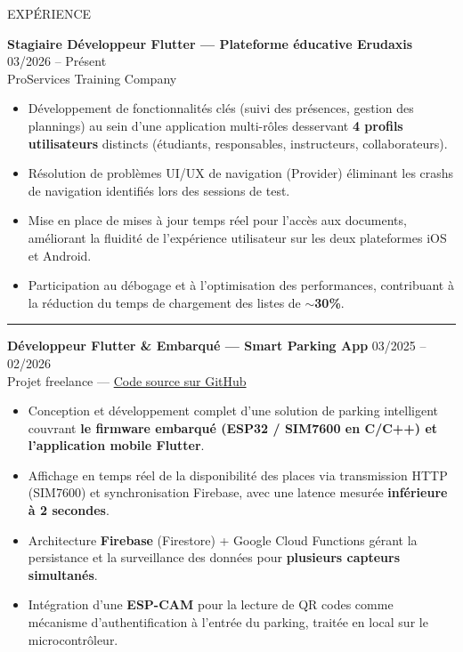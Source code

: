 \documentclass{resume}
\begin{document}
\begin{rSection}{EXPÉRIENCE}

{\bf Stagiaire Développeur Flutter — Plateforme éducative Erudaxis} \hfill {03/2026 -- Présent}\\
ProServices Training Company
\begin{itemize}
    \item Développement de fonctionnalités clés (suivi des présences, gestion des plannings) au sein
          d'une application multi-rôles desservant \textbf{4 profils utilisateurs} distincts
          (étudiants, responsables, instructeurs, collaborateurs).
    \item Résolution de problèmes UI/UX de navigation (Provider) éliminant les crashs de navigation identifiés lors des sessions de test.
    \item Mise en place de mises à jour temps réel pour l'accès aux documents, améliorant la fluidité
          de l'expérience utilisateur sur les deux plateformes iOS et Android.
    \item Participation au débogage et à l'optimisation des performances, contribuant à la réduction
          du temps de chargement des listes de \textbf{$\sim$30\%}.
\end{itemize}

\vspace{0.05cm}
\noindent\rule{\textwidth}{0.2pt}
\vspace{0.05cm}

{\bf Développeur Flutter \& Embarqué — Smart Parking App} \hfill {03/2025 -- 02/2026}\\
Projet freelance — \href{https://github.com/hxhamdi/ESP32-Camera-QR-Decode}{Code source sur GitHub}
\begin{itemize}
    \item Conception et développement complet d'une solution de parking intelligent couvrant
          \textbf{le firmware embarqué (ESP32 / SIM7600 en C/C++) et l'application mobile Flutter}.
    \item Affichage en temps réel de la disponibilité des places via transmission HTTP (SIM7600)
          et synchronisation Firebase, avec une latence mesurée \textbf{inférieure à 2 secondes}.
    \item Architecture \textbf{Firebase} (Firestore) + Google Cloud Functions gérant la persistance et la
          surveillance des données pour \textbf{plusieurs capteurs simultanés}.
    \item Intégration d'une \textbf{ESP-CAM} pour la lecture de QR codes comme mécanisme
          d'authentification à l'entrée du parking, traitée en local sur le microcontrôleur.
\end{itemize}


\end{rSection}
\end{document}
